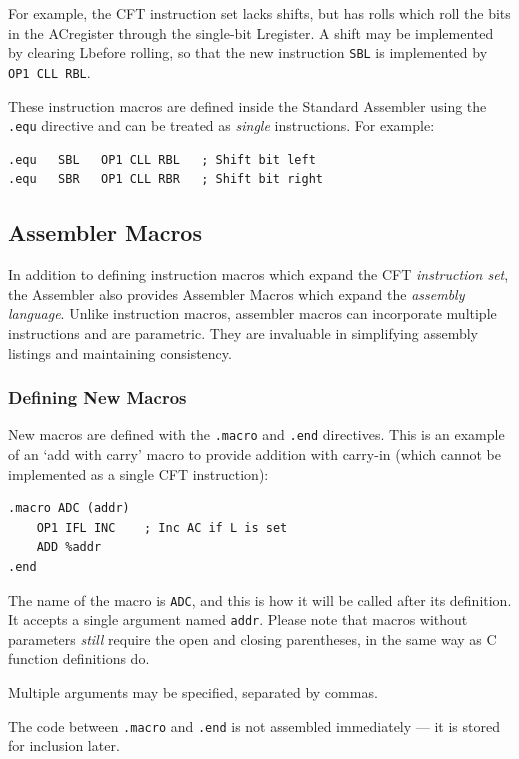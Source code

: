 \documentclass[11pt,a4paper,twocolumns]{article}
\newcommand\op[1]{\texttt{#1}}
\newcommand\f[1]{{\color{black}\texttt{#1}}}
\newcommand\register[1]{\textsf{#1}}
\newcommand\A{\register{AC}}
\newcommand\Areg{\A}
\newcommand\Lreg{\register{L}}
\begin{document}
For example, the CFT instruction set lacks shifts, but has rolls which roll the
bits in the \Areg register through the single-bit \Lreg register. A shift may
be implemented by clearing \Lreg before rolling, so that the new instruction
\op{SBL} is implemented by \op{OP1 CLL RBL}.

These instruction macros are defined inside the Standard Assembler using the
\f{.equ} directive and can be treated as {\em single} instructions. For example:

\begin{verbatim}
.equ   SBL   OP1 CLL RBL   ; Shift bit left
.equ   SBR   OP1 CLL RBR   ; Shift bit right
\end{verbatim}



\subsection{Assembler Macros}

In addition to defining instruction macros which expand the CFT {\em
  instruction set}, the Assembler also provides Assembler Macros which expand
the {\em assembly language}. Unlike instruction macros, assembler macros can
incorporate multiple instructions and are parametric. They are invaluable in
simplifying assembly listings and maintaining consistency.

\subsubsection{Defining New Macros}

New macros are defined with the \f{.macro} and \f{.end} directives. This is an
example of an ‘add with carry’ macro to provide addition with carry-in (which
cannot be implemented as a single CFT instruction):

\begin{verbatim}
.macro ADC (addr)
    OP1 IFL INC    ; Inc AC if L is set
    ADD %addr
.end
\end{verbatim}

The name of the macro is \op{ADC}, and this is how it will be called after its
definition. It accepts a single argument named \op{addr}. Please note that
macros without parameters {\em still} require the open and closing parentheses,
in the same way as C function definitions do.

Multiple arguments may be specified, separated by commas.

The code between \f{.macro} and \f{.end} is not assembled immediately — it is
stored for inclusion later.
\end{document}
